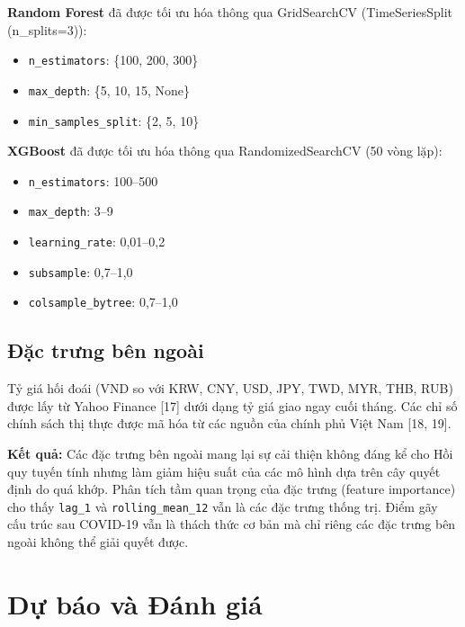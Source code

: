 \documentclass[
]{article}
\providecommand{\tightlist}{%
  \setlength{\itemsep}{0pt}\setlength{\parskip}{0pt}}
\begin{document}
\textbf{Random Forest} đã được tối ưu hóa thông qua GridSearchCV
(TimeSeriesSplit (n\_splits=3)):

\begin{itemize}
\tightlist
\item
  \texttt{n\_estimators}: \{100, 200, 300\}
\item
  \texttt{max\_depth}: \{5, 10, 15, None\}
\item
  \texttt{min\_samples\_split}: \{2, 5, 10\}
\end{itemize}

\textbf{XGBoost} đã được tối ưu hóa thông qua RandomizedSearchCV (50
vòng lặp):

\begin{itemize}
\tightlist
\item
  \texttt{n\_estimators}: 100--500
\item
  \texttt{max\_depth}: 3--9
\item
  \texttt{learning\_rate}: 0,01--0,2
\item
  \texttt{subsample}: 0,7--1,0
\item
  \texttt{colsample\_bytree}: 0,7--1,0
\end{itemize}

\subsection{Đặc trưng bên
ngoài}\label{ux111ux1eb7c-trux1b0ng-buxean-ngouxe0i}

Tỷ giá hối đoái (VND so với KRW, CNY, USD, JPY, TWD, MYR, THB, RUB) được
lấy từ Yahoo Finance {[}17{]} dưới dạng tỷ giá giao ngay cuối tháng. Các
chỉ số chính sách thị thực được mã hóa từ các nguồn của chính phủ Việt
Nam {[}18, 19{]}.

\textbf{Kết quả:} Các đặc trưng bên ngoài mang lại sự cải thiện không
đáng kể cho Hồi quy tuyến tính nhưng làm giảm hiệu suất của các mô hình
dựa trên cây quyết định do quá khớp. Phân tích tầm quan trọng của đặc
trưng (feature importance) cho thấy \texttt{lag\_1} và
\texttt{rolling\_mean\_12} vẫn là các đặc trưng thống trị. Điểm gãy cấu
trúc sau COVID-19 vẫn là thách thức cơ bản mà chỉ riêng các đặc trưng
bên ngoài không thể giải quyết được.

\newpage

\section{Dự báo và Đánh
giá}\label{dux1ef1-buxe1o-vuxe0-ux111uxe1nh-giuxe1}
\end{document}
